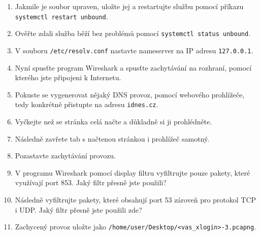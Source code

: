 \begin{enumerate}
    \item Jakmile je soubor upraven, uložte jej a restartujte službu pomocí příkazu \texttt{systemctl restart unbound}.
    \item Ověřte zdali služba běží bez problémů pomocí \texttt{systemctl status unbound}.
    \item V souboru \texttt{/etc/resolv.conf} nastavte nameserver na IP adresu \texttt{127.0.0.1}.
    \item Nyní spusťte program Wireshark a spusťte zachytávání na rozhraní, pomocí kterého jste připojeni k Internetu.
    \item Pokuste se vygenerovat nějaký DNS provoz, pomocí webového prohlížeče, tedy konkrétně přistupte na adresu \texttt{idnes.cz}.
    \item Vyčkejte než se stránka celá načte a důkladně si ji prohlédněte.
    \item Následně zavřete tab s načtenou stránkou i prohlížeč samotný.
    \item Pozastavte zachytávání provozu.
    \item V programu Wireshark pomocí display filtru vyfiltrujte pouze pakety, které využívají port 853. Jaký filtr přesně jste použili?
    \item Následně vyfiltrujte pakety, které obsahují port 53 zároveň pro protokol TCP i UDP. Jaký filtr přesně jste použili zde?
    \item Zachycený provoz uložte jako \texttt{/home/user/Desktop/<vas\_xlogin>-3.pcapng}.
\end{enumerate}


\newpage
